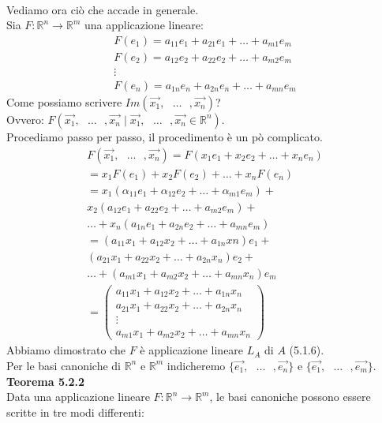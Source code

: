 \documentclass{article}
\begin{document}
\vspace{10px}\textbf{\\}
Vediamo ora ciò che accade in generale.
\\ Sia $F : \mathbb{R}^n \to \mathbb{R}^m$ una applicazione lineare:
\begin{align*}
  F(e_1)=a_{11}e_1+a_{21}e_1+\dots+a_{m1}e_m \\
  F(e_2)=a_{12}e_2+a_{22}e_2+\dots+a_{m2}e_m \\
  \vdots \\
  F(e_n)=a_{1n}e_n+a_{2n}e_n+\dots+a_{mn}e_m 
\end{align*}
Come possiamo scrivere $Im(\vec{x_1},\text{ }\dots\text{ },\vec{x_n})$? \\Ovvero: $F(\vec{x_1},\text{ }\dots\text{ },\vec{x_n} \mid \vec{x_1},\text{ }\dots\text{ },\vec{x_n} \in \mathbb{R}^n)$.
\\Procediamo passo per passo, il procedimento è un pò complicato.
\begin{align*}
  F(\vec{x_1},\text{ }\dots\text{ },\vec{x_n})=F(x_1e_1+x_2e_2+\dots+x_ne_n) \\
  = x_1F(e_1)+x_2F(e_2)+\dots+x_nF(e_n) \\
  =x_1(\alpha_{11}e_1+\alpha_{12}e_2+\dots+\alpha_{m1}e_m)+\\x_2(a_{12}e_1+a_{22}e_2+\dots+a_{m2}e_m)+\\\dots+x_n(a_{1n}e_1+a_{2n}e_2+\dots+a_{mn}e_m) \\
  =(a_{11}x_1+a_{12}x_2+\dots+a_{1n}xn)e_1 + \\(a_{21}x_1+a_{22}x_2+\dots+a_{2n}x_n)e_2+\\ \dots +(a_{m1}x_1+a_{m2}x_2+\dots+a_{mn}x_n)e_m \\
  = \begin{pmatrix}
    a_{11}x_1+a_{12}x_2+\dots+a_{1n}x_n \\
    a_{21}x_1+a_{22}x_2+\dots+a_{2n}x_n \\
    \vdots \\
    a_{m1}x_1+a_{m2}x_2+\dots+a_{mn}x_n 
  \end{pmatrix}
\end{align*}
Abbiamo dimostrato che $F$ è applicazione lineare $L_A$ di $A$ (5.1.6).
\\Per le basi canoniche di $\mathbb{R}^n$ e $\mathbb{R}^m$ indicheremo $\{\vec{e_1},\text{ }\dots\text{ },\vec{e_n}\}$ e $\{\vec{e_1},\text{ }\dots\text{ },\vec{e_m}\}$.
\pagebreak\textbf{\\Teorema 5.2.2}
\\ Data una applicazione lineare $F : \mathbb{R}^n \to \mathbb{R}^m$, le basi canoniche possono essere scritte in tre modi differenti:
\end{document}
